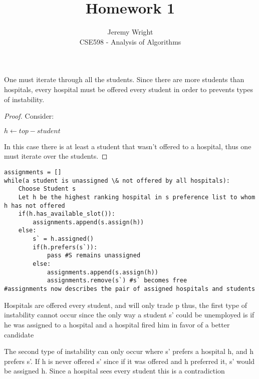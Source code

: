 \documentclass[12pt]{article}
\newenvironment{problem}[2][Problem]{\begin{trivlist}
\item[\hskip \labelsep {\bfseries #1}\hskip \labelsep {\bfseries #2.}]}{\end{trivlist}}
\begin{document}
 
 
\title{Homework 1}%
\author{Jeremy Wright\\ %
CSE598 - Analysis of Algorithms} %
 
\maketitle
\begin{problem}{1.4}
    One must iterate through all the students. Since there are more students
    than hospitals, every hospital must be offered every student in order to
    prevents types of instability.

    \begin{proof}
        Consider:\\
        \begin{algorithmic}
            \State $h \gets top-student$
            \EndFor
        \end{algorithmic}
        In this case there is at least a student that wasn't offered to
        a hospital, thus one must iterate over the students.
    \end{proof}
    \lstset{language=Python}
    \begin{lstlisting}
assignments = []
while(a student is unassigned \& not offered by all hospitals):
    Choose Student s
    Let h be the highest ranking hospital in s preference list to whom h has not offered
    if(h.has_available_slot()):
        assignments.append(s.assign(h))
    else:
        s` = h.assigned()
        if(h.prefers(s`)):
            pass #S remains unassigned
        else:
            assignments.append(s.assign(h))
            assignments.remove(s`) #s` becomes free
#assignments now describes the pair of assigned hospitals and students
    \end{lstlisting}

    Hospitals are offered every student, and will only trade p thus, the first
    type of instability cannot occur since the only way a student s' could be
    unemployed is if he was assigned to a hospital and a hospital fired him in
    favor of a better candidate

    The second type of instability can only occur where s' prefers a hospital h,
    and h prefers s'. If h is never offered s'  since if it was offered and
    h preferred it, s' would be assigned h. Since a hospital sees every student this is a contradiction
\end{problem}
\end{document}
